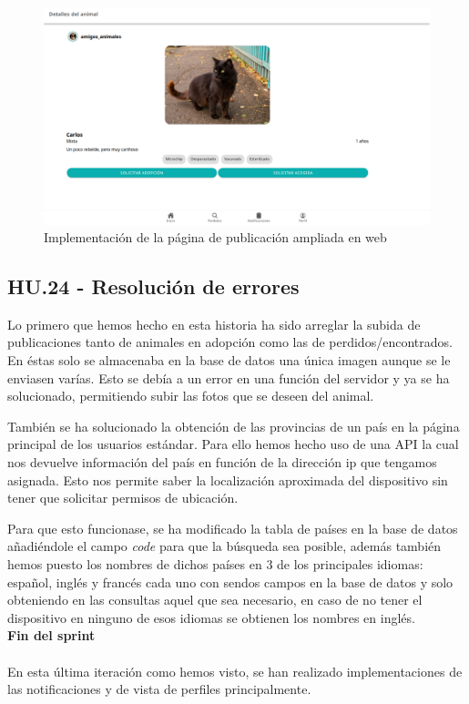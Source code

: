 \begin{figure}[H]
	\centering
	\includegraphics[width=0.8\linewidth]{"sprint 4/hu23/publicacionAmpliadaWeb"}
	\caption{Implementación de la página de publicación ampliada en web}
	\label{fig:publicacionampliadaweb}
\end{figure}

\subsection{HU.24 - Resolución de errores}

Lo primero que hemos hecho en esta historia ha sido arreglar la subida de publicaciones tanto de animales en adopción como las de perdidos/encontrados. En éstas solo se almacenaba en la base de datos una única imagen aunque se le enviasen varías. Esto se debía a un error en una función del servidor y ya se ha solucionado, permitiendo subir las fotos que se deseen del animal.

También se ha solucionado la obtención de las provincias de un país en la página principal de los usuarios estándar. Para ello hemos hecho uso de una API \cite{apiIp} la cual nos devuelve información del país en función de la dirección ip que tengamos asignada. Esto nos permite saber la localización aproximada del dispositivo sin tener que solicitar permisos de ubicación.

Para que esto funcionase, se ha modificado la tabla de países en la base de datos añadiéndole el campo \textit{code} para que la búsqueda sea posible, además también hemos puesto los nombres de dichos países en 3 de los principales idiomas: español, inglés y francés cada uno con sendos campos en la base de datos y solo obteniendo en las consultas aquel que sea necesario, en caso de no tener el dispositivo en ninguno de esos idiomas se obtienen los nombres en inglés. \\

\Large{\textbf{Fin del sprint}} \\ \\
En esta última iteración como hemos visto, se han realizado implementaciones de las notificaciones y de vista de perfiles principalmente. 

